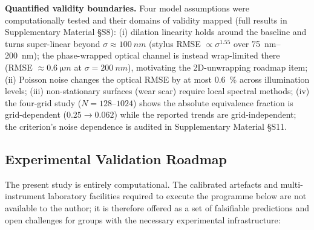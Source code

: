 \documentclass[review,12pt]{elsarticle}
\begin{document}
\textbf{Quantified validity boundaries.} Four model assumptions were computationally tested and their domains of validity mapped (full results in Supplementary Material \S S8): (i) dilation linearity holds around the baseline and turns super-linear beyond $\sigma\approx\SI{100}{nm}$ (stylus RMSE $\propto\sigma^{1.55}$ over \SIrange{75}{200}{nm}); the phase-wrapped optical channel is instead wrap-limited there (RMSE $\approx\SI{0.6}{\micro m}$ at $\sigma=\SI{200}{nm}$), motivating the 2D-unwrapping roadmap item; (ii) Poisson noise changes the optical RMSE by at most \SI{0.6}{\percent} across illumination levels; (iii) non-stationary surfaces (wear scar) require local spectral methods; (iv) the four-grid study ($N=128$--$1024$) shows the absolute equivalence fraction is grid-dependent ($0.25\to0.062$) while the reported trends are grid-independent; the criterion's noise dependence is audited in Supplementary Material \S S11.

\subsection{Experimental Validation Roadmap}

The present study is entirely computational. The calibrated artefacts and multi-instrument laboratory facilities required to execute the programme below are not available to the author; it is therefore offered as a set of falsifiable predictions and open challenges for groups with the necessary experimental infrastructure:
\end{document}
